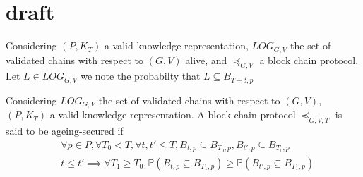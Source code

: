\section{draft}
	
	\begin{mydef}
		Considering $(P,K_T)$ a valid knowledge representation, $LOG_{G,V}$ the set of validated chains with respect to $(G,V)$ alive, and $\preceq_{G,V}$ a block chain protocol. Let $L \in LOG_{G,V}$ we note 
		the probabilty that $L \subseteq B_{T+\delta,p}$  
	\end{mydef}
	
	
\begin{mydef}
	Considering $LOG_{G,V}$ the set of validated chains with respect to $(G,V)$, $(P,K_T)$ a valid knowledge representation. A block chain protocol $\preceq_{G,V,T}$ is said to be ageing-secured if
	\begin{eqnarray*}
		&\forall p \in P,\forall T_0 < T, \forall t,t' \leq T, B_{t,p} \subseteq B_{T_0,p}, B_{t',p} \subseteq B_{T_0,p} \\
		&t\leq t' \implies \forall T_1\geq T_0 , \mathbb{P}(B_{t,p}\subseteq B_{T_1,p}) \geq \mathbb{P}(B_{t',p}\subseteq B_{T_1,p})
	\end{eqnarray*}
\end{mydef}

